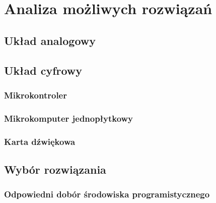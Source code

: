 \chapter{Analiza możliwych rozwiązań}
\label{cha:możliwe_układy}

\section{Układ analogowy}
\label{sec:analog}

\section{Układ cyfrowy}
\label{sec:digital}

\subsection{Mikrokontroler}
\label{uC}

\subsection{Mikrokomputer jednopłytkowy}
\label{mikrokomp}

\subsection{Karta dźwiękowa}
\label{soundcard}

\section{Wybór rozwiązania}
\label{sec:wybór}

\subsection{Odpowiedni dobór środowiska programistycznego}
\label{sec:IDE}
